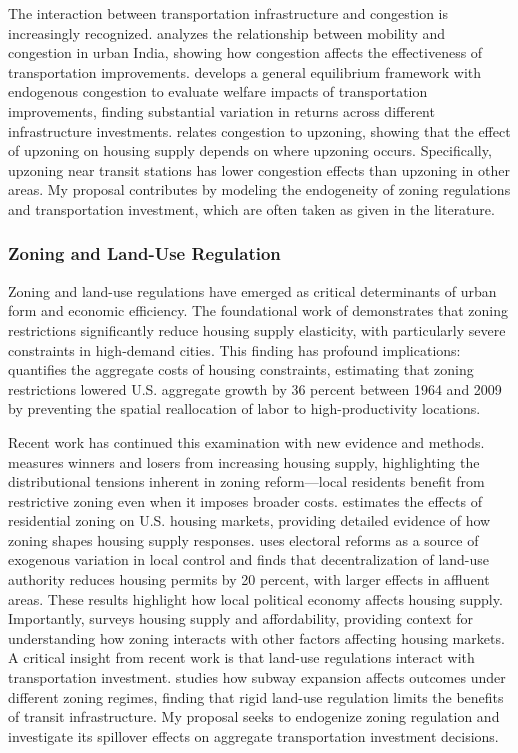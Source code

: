 \documentclass[12pt, a4paper]{article}
\begin{document}
The interaction between transportation infrastructure and congestion is increasingly recognized. \citet{Akbar2023-ce} analyzes the relationship between mobility and congestion in urban India, showing how congestion affects the effectiveness of transportation improvements. \citet{Allen2022-ms} develops a general equilibrium framework with endogenous congestion to evaluate welfare impacts of transportation improvements, finding substantial variation in returns across different infrastructure investments. \citet{Kashner2025-iv} relates congestion to upzoning, showing that the effect of upzoning on housing supply depends on where upzoning occurs. Specifically, upzoning near transit stations has lower congestion effects than upzoning in other areas. My proposal contributes by modeling the endogeneity of zoning regulations and transportation investment, which are often taken as given in the literature.
\subsubsection{Zoning and Land-Use Regulation}

Zoning and land-use regulations have emerged as critical determinants of urban form and economic efficiency. The foundational work of \citet{Glaeser2002-vq} demonstrates that zoning restrictions significantly reduce housing supply elasticity, with particularly severe constraints in high-demand cities. This finding has profound implications: \citet{Hsieh2019-rx} quantifies the aggregate costs of housing constraints, estimating that zoning restrictions lowered U.S. aggregate growth by 36 percent between 1964 and 2009 by preventing the spatial reallocation of labor to high-productivity locations.

Recent work has continued this examination with new evidence and methods. \citet{Rollet2025-mk} measures winners and losers from increasing housing supply, highlighting the distributional tensions inherent in zoning reform---local residents benefit from restrictive zoning even when it imposes broader costs. \citet{Song2025-ft} estimates the effects of residential zoning on U.S. housing markets, providing detailed evidence of how zoning shapes housing supply responses. \citet{Mast2024-zi} uses electoral reforms as a source of exogenous variation in local control and finds that decentralization of land-use authority reduces housing permits by 20 percent, with larger effects in affluent areas. These results highlight how local political economy affects housing supply. Importantly, \citet{Baum-Snow2025-ml} surveys housing supply and affordability, providing context for understanding how zoning interacts with other factors affecting housing markets. A critical insight from recent work is that land-use regulations interact with transportation investment. \citet{Hu2025-hj} studies how subway expansion affects outcomes under different zoning regimes, finding that rigid land-use regulation limits the benefits of transit infrastructure. My proposal seeks to endogenize zoning regulation and investigate its spillover effects on aggregate transportation investment decisions.
\end{document}
